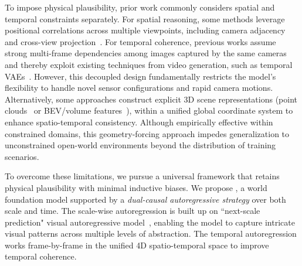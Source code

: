 To impose physical plausibility, prior work commonly considers spatial and temporal constraints separately. For spatial reasoning, some methods leverage positional correlations across multiple viewpoints, including camera adjacency~\cite{gao2023magicdrive,wen2024panacea} and cross-view projection~\cite{guo2025dist4ddisentangledspatiotemporaldiffusion}. For temporal coherence, previous works assume strong multi-frame dependencies among images captured by the same cameras~\cite{wen2024panacea,wang2024driving,russell2025gaia2controllablemultiviewgenerative} and thereby exploit existing techniques from video generation, such as temporal VAEs~\cite{yang2025cogvideoxtexttovideodiffusionmodels,brooks2024video}. However, this decoupled design fundamentally restricts the model's flexibility to handle novel sensor configurations and rapid camera motions. Alternatively, some approaches construct explicit 3D scene representations (\eg point clouds~\cite{xie2024x,zhou2025hermes} or BEV/volume features~\cite{zhang2024bevworld,lu2023wovogen}), within a unified global coordinate system to enhance spatio-temporal consistency. Although empirically effective within constrained domains, this geometry-forcing approach impedes generalization to unconstrained open-world environments beyond the distribution of training scenarios.

To overcome these limitations, we pursue a universal framework that retains physical plausibility with minimal inductive biases. We propose \ourmethod{}, a world foundation model supported by a \textit{dual-causal autoregressive strategy} over both scale and time. The scale-wise autoregression is built up on ``next-scale prediction" visual autoregressive model~\cite{tian2024visual,han2024infinity}, enabling the model to capture intricate visual patterns across multiple levels of abstraction. The temporal autoregression works frame-by-frame in the unified 4D spatio-temporal space to improve temporal coherence.

